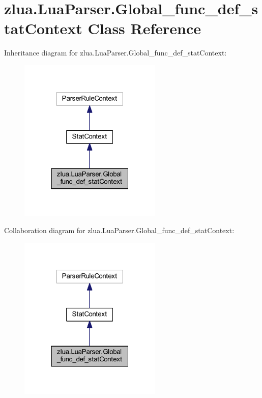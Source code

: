 \hypertarget{classzlua_1_1_lua_parser_1_1_global__func__def__stat_context}{}\section{zlua.\+Lua\+Parser.\+Global\+\_\+func\+\_\+def\+\_\+stat\+Context Class Reference}
\label{classzlua_1_1_lua_parser_1_1_global__func__def__stat_context}


Inheritance diagram for zlua.\+Lua\+Parser.\+Global\+\_\+func\+\_\+def\+\_\+stat\+Context\+:
\nopagebreak
\begin{figure}[H]
\begin{center}
\leavevmode
\includegraphics[width=193pt]{classzlua_1_1_lua_parser_1_1_global__func__def__stat_context__inherit__graph}
\end{center}
\end{figure}


Collaboration diagram for zlua.\+Lua\+Parser.\+Global\+\_\+func\+\_\+def\+\_\+stat\+Context\+:
\nopagebreak
\begin{figure}[H]
\begin{center}
\leavevmode
\includegraphics[width=193pt]{classzlua_1_1_lua_parser_1_1_global__func__def__stat_context__coll__graph}
\end{center}
\end{figure}
